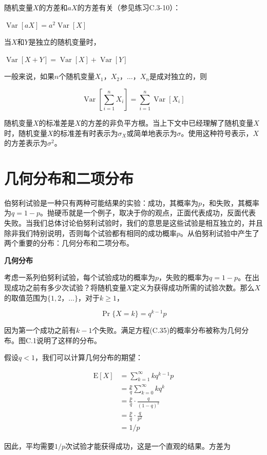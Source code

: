 \documentclass[lang=cn,newtx,10pt,scheme=chinese]{elegantbook}
\begin{document}
随机变量$X$的方差和$aX$的方差有关（参见练习C.3-10）：

$\operatorname{Var}[a X]=a^2 \operatorname{Var}[X]$

当$X$和$Y$是独立的随机变量时，

$\operatorname{Var}[X+Y]=\operatorname{Var}[X]+\operatorname{Var}[Y]$

一般来说，如果$n$个随机变量$X_1，X_2，\ldots，X_n$是成对独立的，则

$$
\operatorname{Var}[\sum_{i=1}^n X_i]=\sum_{i=1}^n \operatorname{Var}[X_i]
$$

随机变量$X$的标准差是$X$的方差的非负平方根。当上下文中已经理解了随机变量$X$时，随机变量$X$的标准差有时表示为$\sigma_X$或简单地表示为$\sigma$。使用这种符号表示，$X$的方差表示为$\sigma^2$。

\section{几何分布和二项分布}\label{section:C.4}

伯努利试验是一种只有两种可能结果的实验：成功，其概率为$p$，和失败，其概率为$q=1-p$。抛硬币就是一个例子，取决于你的观点，正面代表成功，反面代表失败。当我们总体讨论伯努利试验时，我们的意思是这些试验是相互独立的，并且除非我们特别说明，否则每个试验都有相同的成功概率$p$。从伯努利试验中产生了两个重要的分布：几何分布和二项分布。

\textbf{几何分布}

考虑一系列伯努利试验，每个试验成功的概率为$p$，失败的概率为$q=1-p$。在出现成功之前有多少次试验？将随机变量$X$定义为获得成功所需的试验次数。那么$X$的取值范围为$\{1,2，\ldots\}$，对于$k \geq 1$，

$$
\operatorname{Pr}\{X=k\}=q^{k-1} p
$$

因为第一个成功之前有$k-1$个失败。满足方程(C.35)的概率分布被称为几何分布。图C.1说明了这样的分布。

假设$q<1$，我们可以计算几何分布的期望：

$$
\begin{aligned}
\mathrm{E}[X] & =\sum_{k=1}^{\infty} k q^{k-1} p \\
& =\frac{p}{q} \sum_{k=0}^{\infty} k q^k \\
& =\frac{p}{q} \cdot \frac{q}{(1-q)^2} \\
& =\frac{p}{q} \cdot \frac{q}{p^2} \\
& =1 / p
\end{aligned}
$$

因此，平均需要$1/p$次试验才能获得成功，这是一个直观的结果。方差为
\end{document}
